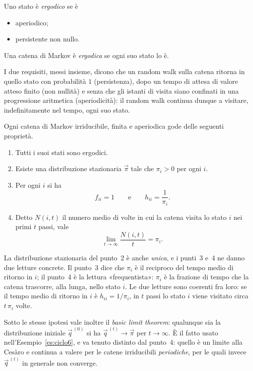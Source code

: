 \begin{definizione}\label{def:mc-ergodico}
  Uno stato è \emph{ergodico} se è
  \begin{itemize}
    \item aperiodico;
    \item persistente non nullo.
  \end{itemize}
  Una catena di Markov è \emph{ergodica} se ogni suo stato lo è.
\end{definizione}

\begin{osservazione}
  I due requisiti, messi insieme, dicono che un random walk sulla catena ritorna in quello
  stato con probabilità $1$ (persistenza), dopo un tempo di attesa di valore atteso finito
  (non nullità) e senza che gli istanti di visita siano confinati in una progressione
  aritmetica (aperiodicità): il random walk continua dunque a visitare, indefinitamente nel
  tempo, ogni suo stato.
\end{osservazione}

\begin{teorema}\label{thm:mc-fondamentale}
  Ogni catena di Markov irriducibile, finita e aperiodica gode delle seguenti proprietà.
  \begin{enumerate}
    \item Tutti i suoi stati sono ergodici.
    \item Esiste una distribuzione stazionaria $\vec{\pi}$ tale che $\pi_i>0$ per ogni $i$.
    \item Per ogni $i$ si ha
      \[
        f_{ii}=1 \qquad\text{e}\qquad h_{ii}=\frac{1}{\pi_i}.
      \]
    \item {}%
      Detto $N(i,t)$ il numero medio di volte in cui la catena visita lo stato $i$ nei
      primi $t$ passi, vale
      \[
        \lim_{t\to\infty}\frac{N(i,t)}{t}=\pi_i .
      \]
  \end{enumerate}
\end{teorema}

\begin{osservazione}
  La distribuzione stazionaria del punto~2 è anche \emph{unica}, e i punti~3 e~4 ne danno
  due letture concrete. Il punto~3 dice che $\pi_i$ è il reciproco del tempo medio di
  ritorno in $i$; il punto~4 è la lettura «frequentista»: $\pi_i$ è la frazione di tempo
  che la catena trascorre, alla lunga, nello stato $i$. Le due letture sono coerenti fra
  loro: se il tempo medio di ritorno in $i$ è $h_{ii}=1/\pi_i$, in $t$ passi lo stato $i$
  viene visitato circa $t\,\pi_i$ volte.

  Sotto le stesse ipotesi vale inoltre il \emph{basic limit theorem}: qualunque sia la
  distribuzione iniziale $\vec{q}^{\,(0)}$ si ha $\vec{q}^{\,(t)} \to \vec{\pi}$ per
  $t\to\infty$. È il fatto usato nell'Esempio~\ref{es:ciclo6}, e va tenuto distinto dal
  punto~4: quello è un limite alla Cesàro e continua a valere per le catene irriducibili
  \emph{periodiche}, per le quali invece $\vec{q}^{\,(t)}$ in generale non converge.
\end{osservazione}
